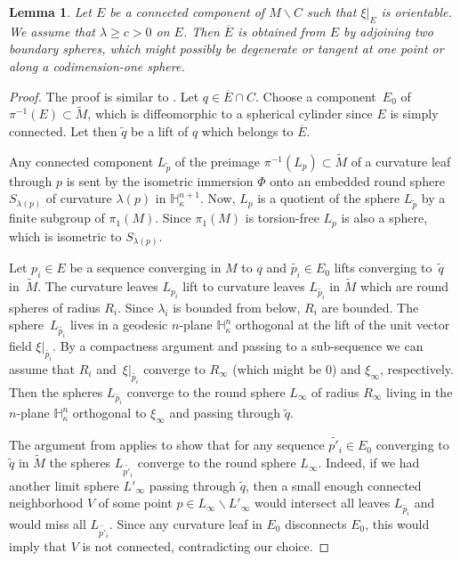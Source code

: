 \documentclass[10pt]{amsart}
\let\moins\smallsetminus
\newtheorem{lemma}[theorem]{Lemma}
\theoremstyle{definition}
\theoremstyle{remark}
\numberwithin{equation}{section}
\begin{document}
\begin{lemma}\label{compactification}
Let $E$ be a connected component of $M\moins C$ such that $\xi|_E$ is orientable. We assume that
$\lambda \geq c >0$ on $E$.
Then $\overline{E}$ is obtained from $E$ by adjoining
two boundary spheres, which might possibly be degenerate or tangent at one point or along a codimension-one sphere.
\end{lemma}
\begin{proof}
The proof is similar to \cite[Lem.\,2.7]{DDM}.
Let $q\in \overline{E}\cap C$.
Choose a component~$E_0$ of $\pi^{-1}(E)\subset \widetilde{M}$, which is diffeomorphic to a spherical cylinder
since $E$ is simply connected.
Let then $\widetilde{q}$ be a lift of $q$ which belongs to $\overline{E}$.

Any connected component $L_{\widetilde{p}}$ of the preimage $\pi^{-1}(L_{p})\subset \widetilde{M}$
of a curvature leaf through $p$
is sent by the isometric immersion $\Phi$ onto an embedded round sphere $S_{\lambda(p)}$ of curvature $\lambda(p)$
in $\mathbb H_{\kappa}^{n+1}$. Now, $L_{p}$ is a quotient of the sphere $L_{\widetilde{p}}$ by a finite subgroup of $\pi_1(M)$. Since $\pi_1(M)$ is torsion-free $L_{p}$ is also a sphere, which is isometric to $S_{\lambda(p)}$.

Let $p_i\in E$ be a sequence converging in $M$ to $q$ and $\widetilde{p_i}\in E_0$ lifts converging to~$\widetilde{q}$
in~$\widetilde{M}$.
The curvature leaves $L_{p_i}$ lift to curvature leaves $L_{\widetilde{p_i}}$ in $\widetilde{M}$
which are round spheres of radius $R_i$. Since $\lambda_i$ is bounded from below,
$R_i$ are bounded. The sphere~$L_{\widetilde{p_i}}$ lives in a geodesic
$n$-plane $\mathbb H_{\kappa}^n$ orthogonal at the lift of the unit vector field $\xi|_{\widetilde{p_i}}$.
By a compactness argument and passing to a sub-sequence we can assume that $R_i$ and~$\xi|_{\widetilde{p_i}}$
converge to $R_{\infty}$ (which might be $0$) and $\xi_{\infty}$, respectively. Then the spheres $L_{\widetilde{p_i}}$ converge to the
round sphere $L_{\infty}$ of radius $R_{\infty}$ living in the $n$-plane $\mathbb H_{\kappa}^n$ orthogonal
to $\xi_{\infty}$ and passing through $\widetilde{q}$.

The argument from \cite[Lem.\,2.7]{DDM} applies to show that
for any sequence $\widetilde{p'_i}\in E_0$ converging to $\widetilde{q}$
in $\widetilde{M}$ the spheres $L_{\widetilde{p'_i}}$ converge to the
round sphere $L_{\infty}$. Indeed, if we had another limit sphere $L'_{\infty}$ passing through $\widetilde{q}$, then a
small enough connected neighborhood $V$ of some point $p\in L_{\infty}\moins L'_{\infty}$ would intersect
all leaves $L_{\widetilde{p_i}}$ and would miss all $L_{\widetilde{p'_i}}$. Since any curvature leaf in
$E_0$ disconnects $E_0$, this would imply that $V$ is not connected, contradicting our choice.


\end{proof}
\end{document}
